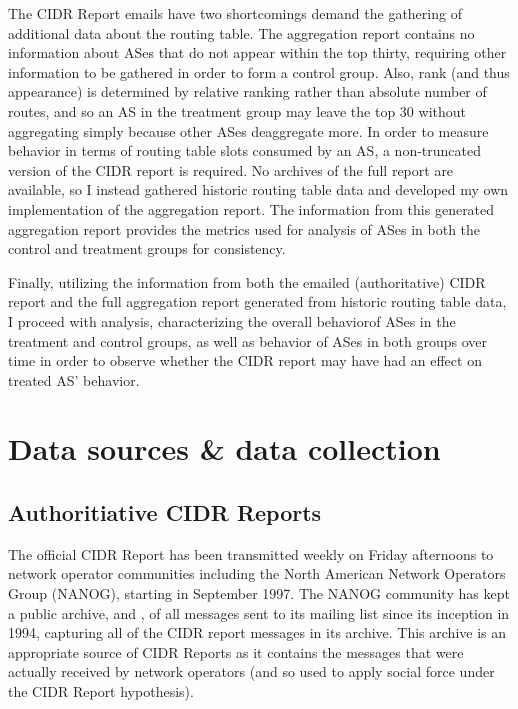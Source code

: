 The CIDR Report emails have two shortcomings demand the gathering of additional data about the routing table. The aggregation report contains no information about ASes that do not appear within the top thirty, requiring other information to be gathered in order to form a control group. Also, rank (and thus appearance) is determined by relative ranking rather than absolute number of routes, and so an AS in the treatment group may leave the top 30 without aggregating simply because other ASes deaggregate more. In order to measure behavior in terms of routing table slots consumed by an AS, a non-truncated version of the CIDR report is required. No archives of the full report are available, so I instead gathered historic routing table data and developed my own implementation of the aggregation report. The information from this generated aggregation report provides the metrics used for analysis of ASes in both the control and treatment groups for consistency.

Finally, utilizing the information from both the emailed (authoritative) CIDR report and the full aggregation report generated from historic routing table data, I proceed with analysis, characterizing the overall behaviorof ASes in the treatment and control groups, as well as behavior of ASes in both groups over time in order to observe whether the CIDR report may have had an effect on treated AS' behavior.

\section{Data sources \& data collection} %

\subsection{Authoritiative CIDR Reports}

The official CIDR Report has been transmitted weekly on Friday afternoons to network operator communities including the North American Network Operators Group (NANOG), starting in September 1997. The NANOG community has kept a public archive, \cite{NANOG-Archives} and \cite{NANOG-NEW-Archives}, of all messages sent to its mailing list since its inception in 1994, capturing all of the CIDR report messages in its archive. This archive is an appropriate source of CIDR Reports as it contains the messages that were actually received by network operators (and so used to apply social force under the CIDR Report hypothesis).

